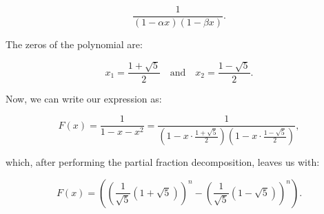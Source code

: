 \[
    \frac{1}{\left(1 - \alpha x\right)\left(1 - \beta x\right)}.
\]

The zeros of the polynomial are:

\[
    x_1 = \frac{1 + \sqrt{5}}{2} \quad \text{and} \quad  x_2 = \frac{1 - \sqrt{5}}{2}.
\]

Now, we can write our expression as:

\[
    F(x) = \frac{1}{1 - x - x^2} = \frac{1}{\left(1 - x \cdot \frac{1 + \sqrt{5}}{2}\right)\left(1 - x 
    \cdot \frac{1 - \sqrt{5}}{2}\right)},
\]

which, after performing the partial fraction decomposition, leaves us with:

\[
    F(x) = \left( {\left( \frac{1}{\sqrt{5}} (1 + \sqrt{5}) \right)}^n - {\left( \frac{1}{\sqrt{5}} 
    (1 - \sqrt{5}) \right)}^n \right).
\]

\QED

